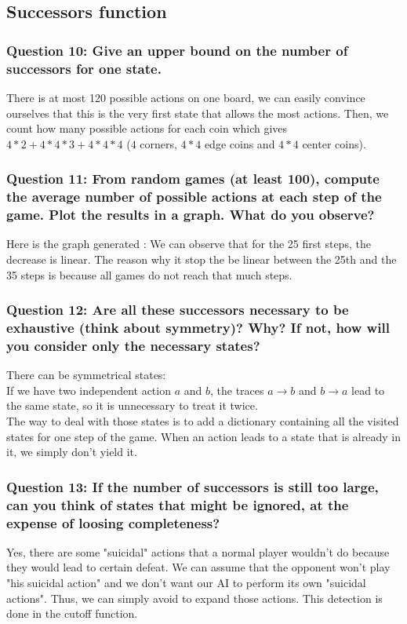 \documentclass[a4paper,10pt]{article}
\begin{document}
			\subsection{Successors function}
				\subsubsection{Question 10: Give an upper bound on the number of successors for one state.}
					There is at most 120 possible actions on one board, we can easily convince ourselves that this is the very first state that allows the most actions. Then, we count how many possible actions for each coin which gives $4*2+4*4*3+4*4*4$ ($4$ corners, $4*4$ edge coins and $4*4$ center coins).
				\subsubsection{Question 11: From random games (at least 100), compute the average number of possible
actions at each step of the game. Plot the results in a graph. What do you observe?}
					Here is the graph generated :
					We can observe that for the 25 first steps, the decrease is linear. The reason why it stop the be linear between the 25th and the 35 steps is because all games do not reach that much steps.
					
				\subsubsection{Question 12: Are all these successors necessary to be exhaustive (think about symmetry)? Why? If not, how will you consider only the necessary states?}
					There can be symmetrical states:\\
					If we have two independent action $a$ and $b$, the traces $a\rightarrow b$ and $b\rightarrow a$ lead to the same state, so it is unnecessary to treat it twice.\\
					The way to deal with those states is to add a dictionary containing all the visited states for one step of the game. When an action leads to a state that is already in it, we simply don't yield it.
				\subsubsection{Question 13: If the number of successors is still too large, can you think of states that might be ignored, at the expense of loosing completeness?}
					Yes, there are some "suicidal" actions that a normal player wouldn't do because they would lead to certain defeat. We can assume that the opponent won't play "his suicidal action" and we don't want our AI to perform its own "suicidal actions". Thus, we can simply avoid to expand those actions. This detection is done in the cutoff function.
\end{document}
